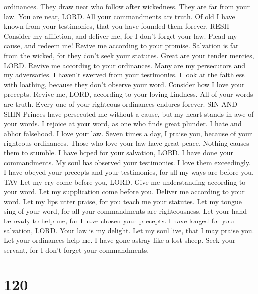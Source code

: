 ordinances.  They draw near who follow after wickedness.
They are far from your law.  You are near, LORD. All your
commandments are truth.  Of old I have known from your
testimonies, that you have founded them forever. RESH 
Consider my affliction, and deliver me, for I don't forget your law.
 Plead my cause, and redeem me! Revive me according to
your promise.  Salvation is far from the wicked, for they
don't seek your statutes.  Great are your tender mercies,
LORD. Revive me according to your ordinances.  Many are my
persecutors and my adversaries. I haven't swerved from your testimonies.
 I look at the faithless with loathing, because they don't
observe your word.  Consider how I love your precepts.
Revive me, LORD, according to your loving kindness.  All
of your words are truth. Every one of your righteous ordinances endures
forever. SIN AND SHIN  Princes have persecuted me without
a cause, but my heart stands in awe of your words.  I
rejoice at your word, as one who finds great plunder.  I
hate and abhor falsehood. I love your law.  Seven times a
day, I praise you, because of your righteous ordinances. 
Those who love your law have great peace. Nothing causes them to
stumble.  I have hoped for your salvation, LORD. I have
done your commandments.  My soul has observed your
testimonies. I love them exceedingly.  I have obeyed your
precepts and your testimonies, for all my ways are before you. TAV
 Let my cry come before you, LORD. Give me understanding
according to your word.  Let my supplication come before
you. Deliver me according to your word.  Let my lips utter
praise, for you teach me your statutes.  Let my tongue
sing of your word, for all your commandments are righteousness.
 Let your hand be ready to help me, for I have chosen your
precepts.  I have longed for your salvation, LORD. Your
law is my delight.  Let my soul live, that I may praise
you. Let your ordinances help me.  I have gone astray like
a lost sheep. Seek your servant, for I don't forget your commandments.

\hypertarget{section-110}{%
\section{120}\label{section-110}}

